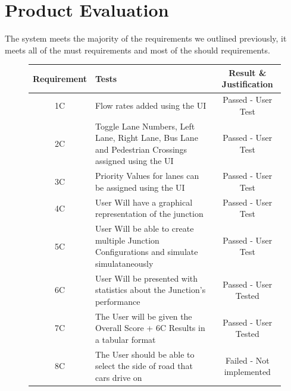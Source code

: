 \documentclass{article}
\begin{document}
    \section{Product Evaluation}

    The system meets the majority of the requirements we outlined previously, it meets all of the must requirements and
    most of the should requirements.

    \begin{figure}[H]
        \begin{center}
            \begin{tabular}{ |c|p{9cm}|c| }
                \hline
                Requirement & Tests                                                                                               & Result \& Justification        \\
                \hline
                1C          & Flow rates added using the UI                                                                       & Passed - User Test             \\
                \hline
                2C          & Toggle Lane Numbers, Left Lane, Right Lane, Bus Lane and Pedestrian Crossings assigned using the UI & Passed - User Test \\
                \hline
                3C          & Priority Values for lanes can be assigned using the UI                                              & Passed - User Test             \\
                \hline
                4C          & User Will have a graphical representation of the junction                                           & Passed - User Test             \\
                \hline
                5C          & User Will be able to create multiple Junction Configurations and simulate simulataneously & Passed - User Test \\
                \hline
                6C          & User Will be presented with statistics about the Junction's performance                             & Passed - User Tested           \\
                \hline
                7C          & The User will be given the Overall Score + 6C Results in a tabular format                           & Passed - User Tested           \\
                \hline
                8C          & The User should be able to select the side of road that cars drive on                               & Failed - Not implemented       \\

\end{tabular}
\end{center}
\end{figure}
\end{document}

